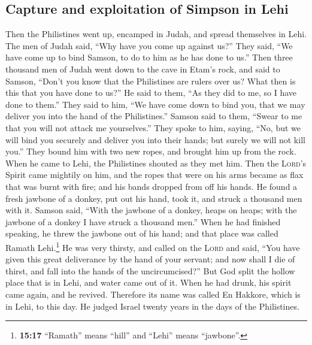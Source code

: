 \hypertarget{capture-and-exploitation-of-simpson-in-lehi}{%
\subsection{Capture and exploitation of Simpson in
Lehi}\label{capture-and-exploitation-of-simpson-in-lehi}}

 Then the Philistines went up, encamped in Judah, and
spread themselves in Lehi.  The men of Judah said, ``Why
have you come up against us?'' They said, ``We have come up to bind
Samson, to do to him as he has done to us.''  Then three
thousand men of Judah went down to the cave in Etam's rock, and said to
Samson, ``Don't you know that the Philistines are rulers over us? What
then is this that you have done to us?'' He said to them, ``As they did
to me, so I have done to them.''  They said to him, ``We
have come down to bind you, that we may deliver you into the hand of the
Philistines.'' Samson said to them, ``Swear to me that you will not
attack me yourselves.''  They spoke to him, saying, ``No,
but we will bind you securely and deliver you into their hands; but
surely we will not kill you.'' They bound him with two new ropes, and
brought him up from the rock.  When he came to Lehi, the
Philistines shouted as they met him. Then the \textsc{Lord}'s Spirit
came mightily on him, and the ropes that were on his arms became as flax
that was burnt with fire; and his bands dropped from off his hands.
 He found a fresh jawbone of a donkey, put out his hand,
took it, and struck a thousand men with it.  Samson said,
``With the jawbone of a donkey, heaps on heaps; with the jawbone of a
donkey I have struck a thousand men.''  When he had
finished speaking, he threw the jawbone out of his hand; and that place
was called Ramath Lehi.\footnote{\textbf{15:17} ``Ramath'' means
  ``hill'' and ``Lehi'' means ``jawbone''.}  He was very
thirsty, and called on the \textsc{Lord} and said, ``You have given this
great deliverance by the hand of your servant; and now shall I die of
thirst, and fall into the hands of the uncircumcised?'' 
But God split the hollow place that is in Lehi, and water came out of
it. When he had drunk, his spirit came again, and he revived. Therefore
its name was called En Hakkore, which is in Lehi, to this day.
 He judged Israel twenty years in the days of the
Philistines.

